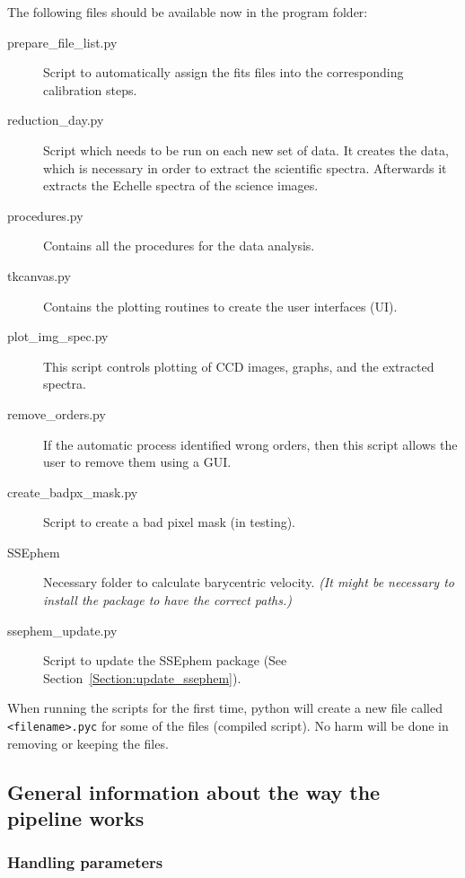 \documentclass[10pt,a4paper]{article}
\begin{document}
\noindent The following files should be available now in the program folder:
\begin{description}
 \item[prepare\_file\_list.py] Script to automatically assign the fits files into the corresponding calibration steps.
 \item[reduction\_day.py] Script which needs to be run on each new set of data. It creates the data, which is necessary in order to extract the scientific spectra. Afterwards it extracts the Echelle spectra of the science images.
 \item[procedures.py] Contains all the procedures for the data analysis.
 \item[tkcanvas.py] Contains the plotting routines to create the user interfaces (UI).
 \item[plot\_img\_spec.py] This script controls plotting of CCD images, graphs, and the extracted spectra.
 \item[remove\_orders.py] If the automatic process identified wrong orders, then this script allows the user to remove them using a GUI.
 \item[create\_badpx\_mask.py] Script to create a bad pixel mask (in testing).
 \item[SSEphem] Necessary folder to calculate barycentric velocity. \textit{(It might be necessary to install the package to have the correct paths.)} 
 \item[ssephem\_update.py] Script to update the SSEphem package (See Section~\ref{Section:update_ssephem}).
\end{description}

When running the scripts for the first time, python will create a new file called \verb|<filename>.pyc| for some of the files (compiled script). No harm will be done in removing or keeping the files.


\subsection{General information about the way the pipeline works}

\subsubsection{Handling parameters}
\end{document}
